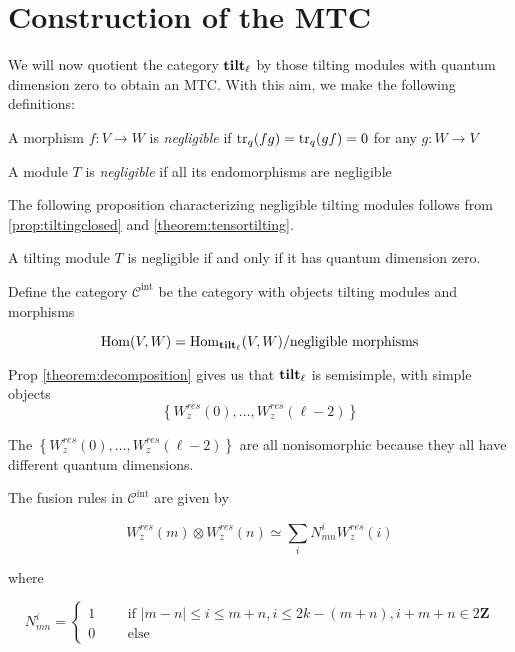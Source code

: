 \section{Construction of the MTC}
\label{MTC-construction}

We will now quotient the category $\mathbf{tilt}_\ell$ by those tilting modules with quantum
dimension zero to obtain an MTC. With this aim, we make the following
definitions:

\begin{defn}
    A morphism $f: V \to W$ is \emph{negligible} if $\operatorname{tr}_q(fg) = \operatorname{tr}_q(gf) = 0$ for any $g: W \to V$
\end{defn}

\begin{defn}
A module $T$ is \emph{negligible} if all its endomorphisms are negligible
\end{defn}

The following proposition characterizing negligible tilting modules follows
from \ref{prop:tiltingclosed} and \ref{theorem:tensortilting}.
\begin{prop}
A tilting module $T$ is negligible if and only if it has quantum dimension
zero. 
\end{prop}

Define the category $\mathcal{C}^\text{int}$ be the category with objects tilting modules and morphisms 

    \begin{equation}
        \operatorname{Hom}(V,W) = \operatorname{Hom}_{\mathbf{tilt}_\ell}(V,W) / \text{negligible morphisms}
    \end{equation}

Prop \ref{theorem:decomposition} gives us that $\mathbf{tilt}_\ell$ is semisimple,
with simple objects 
\begin{equation}
\left\{ W_z^{res}(0), \ldots, W_z^{res}(\ell-2) \right\}
\end{equation}

The $\left\{ W_z^{res}(0), \ldots, W_z^{res}(\ell-2) \right\}$ are all
nonisomorphic because they all have different quantum dimensions.

The fusion rules in $\mathcal{C}^{\text{int}}$ are given by

\begin{equation}
    W_z^{res}(m) \otimes W_z^{res}(n) \simeq \sum_i N_{mn}^i W_z^{res}(i)
\end{equation}

where 

\begin{equation}
    N_{mn}^i = \begin{cases} 1 \qquad \text{ if } |m-n| \leq i \leq m+n, i \leq 2k - (m+n), i + m + n \in 2 \mathbf{Z} \\
                             0 \qquad \text{ else } 
               \end{cases}
\end{equation}

